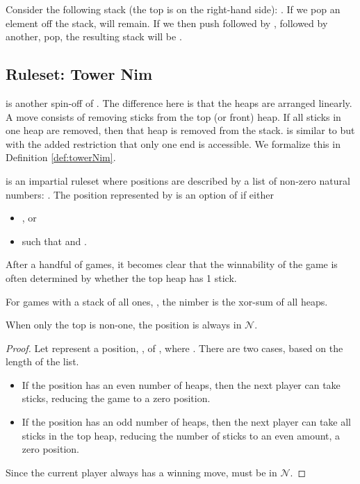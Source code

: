 \documentclass[letter,10pt]{article}
\newcommand{\fuzzy}{\ensuremath{\mathcal{N}}}
\begin{document}
Consider the following stack (the top is on the right-hand side): .  If we pop an element off the stack,  will remain.  If we then push  followed by , followed by another, pop, the resulting stack will be .

\subsection{Ruleset: Tower Nim}

 is another spin-off of .  The difference here is that the heaps are arranged linearly.  A move consists of removing sticks from the top (or front) heap.  If all sticks in one heap are removed, then that heap is removed from the stack.   is similar to  \cite{DBLP:journals/combinatorics/AlbertN01}but with the added restriction that only one end is accessible. We formalize this in Definition \ref{def:towerNim}.

\begin{definition}
	\label{def:towerNim}
	 is an impartial ruleset where positions are described by a list of non-zero natural numbers: .  The position represented by  is an option of  if either
	\begin{itemize}
		\item  , or
		\item   such that  and .
	\end{itemize}
\end{definition}

After a handful of games, it becomes clear that the winnability of the game is often determined by whether the top heap has 1 stick.

\begin{observation}
\label{obs:stackAllOnes}
 	For games with a stack of all ones, , the nimber is the xor-sum of all heaps.
\end{observation}

\begin{lemma}
\label{lem:towerNimBigTop}
	When only the top is non-one, the position is always in \fuzzy.
\end{lemma}
\begin{proof}
	Let  represent a position, , of , where .  There are two cases, based on the length of the list.
	\begin{itemize}
		\item If the position has an even number of heaps, then the next player can take  sticks, reducing the game to a zero position.
		\item If the position has an odd number of heaps, then the next player can take all  sticks in the top heap, reducing the number of sticks to an even amount, a zero position.
	\end{itemize}
	Since the current player always has a winning move,  must be in \fuzzy.
\end{proof}
\end{document}
